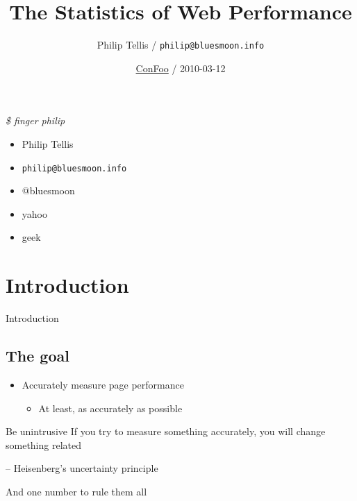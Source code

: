 \documentclass{beamer}
\author{Philip Tellis / \texttt{philip@bluesmoon.info}}
\title{The Statistics of Web Performance}
\date{\href{http://confoo.ca/}{ConFoo} / 2010-03-12}
\begin{document}
\begin{frame}
  \titlepage
\end{frame}


\begin{frame}{\textit{\$ finger philip}}
  \begin{itemize}
  \item Philip Tellis
  \item \small{\texttt{philip@bluesmoon.info}}
  \item @bluesmoon
  \item yahoo
  \item geek
  \end{itemize}
\end{frame}


\section{Introduction}
\begin{frame}{}
  \begin{center} \LARGE{Introduction} \end{center}
\end{frame}

\subsection{The goal}
\begin{frame}{}
  \begin{itemize}
  \item Accurately measure page performance
    \begin{itemize}
    \item<2-> At least, as accurately as possible
    \end{itemize}
  \end{itemize}
\end{frame}

\begin{frame}{Be unintrusive}
If you try to measure something accurately, you will change something related

\hfill \tiny{-- Heisenberg's uncertainty principle}
\end{frame}

\begin{frame}{}
  \begin{center}
  And one number to rule them all
  \end{center}
\end{frame}
\end{document}
